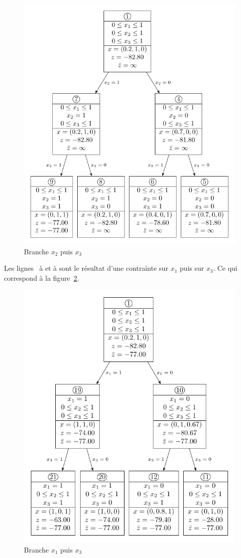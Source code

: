 \begin{figure}[htbp]
	\caption{Branche $x_2$ puis $x_3$}
	\label{arbre2}
	\centering
	\includegraphics[width=.8\linewidth]{question/forest/2.pdf}
\end{figure}

Les lignes~ à  et  à  sont le résultat d’une contrainte sur $x_1$ puis sur $x_3$. Ce qui correspond à la figure~\ref{arbre3}.

\begin{figure}[htb]
	\caption{Branche $x_1$ puis $x_3$}
	\label{arbre3}
	\centering
	\includegraphics[width=.8\linewidth]{question/forest/3.pdf}
\end{figure}

